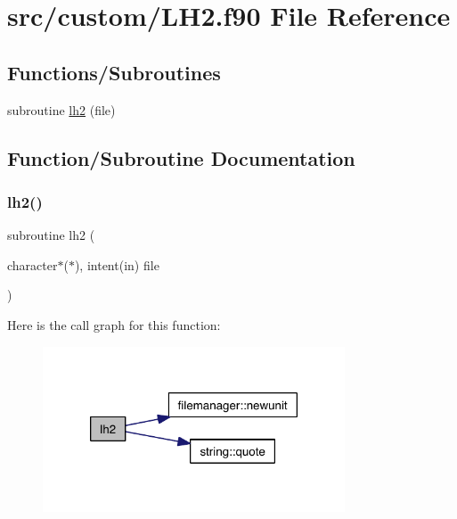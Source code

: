 \hypertarget{_l_h2_8f90}{}\section{src/custom/\+L\+H2.f90 File Reference}
\label{_l_h2_8f90}
\subsection*{Functions/\+Subroutines}
\begin{DoxyCompactItemize}
\item 
subroutine \hyperlink{_l_h2_8f90_abb4056a5b08ce38cac3bc28061aaff25}{lh2} (file)
\end{DoxyCompactItemize}


\subsection{Function/\+Subroutine Documentation}
\mbox{\label{_l_h2_8f90_abb4056a5b08ce38cac3bc28061aaff25}} 
\subsubsection{\texorpdfstring{lh2()}{lh2()}}
{\footnotesize\ttfamily subroutine lh2 (\begin{DoxyParamCaption}\item[{character$\ast$($\ast$), intent(in)}]{file }\end{DoxyParamCaption})}

Here is the call graph for this function\+:\nopagebreak
\begin{figure}[H]
\begin{center}
\leavevmode
\includegraphics[width=254pt]{_l_h2_8f90_abb4056a5b08ce38cac3bc28061aaff25_cgraph}
\end{center}
\end{figure}
